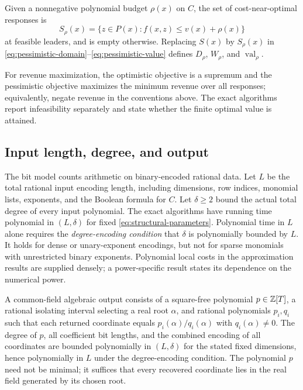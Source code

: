 Given a nonnegative polynomial budget $\rho(x)$ on $C$, the set of
cost-near-optimal responses is
\begin{equation}\label{eq:nearoptimal-set}
 S_\rho(x)=\{z\in P(x):f(x,z)\le v(x)+\rho(x)\}
\end{equation}
at feasible leaders, and is empty otherwise. Replacing $S(x)$ by
$S_\rho(x)$ in \eqref{eq:pessimistic-domain}--\eqref{eq:pessimistic-value}
defines $D_\rho$, $W_\rho$, and $\operatorname{val}_\rho$.

For revenue maximization, the optimistic objective is a supremum and the
pessimistic objective maximizes the minimum revenue over all responses;
equivalently, negate revenue in the conventions above. The exact
algorithms report infeasibility separately and state whether the finite
optimal value is attained.

\subsection{Input length, degree, and output}\label{subsec:encoding}

The bit model counts arithmetic on binary-encoded rational data. Let $L$
be the total rational input encoding length, including dimensions, row
indices, monomial lists, exponents, and the Boolean formula for $C$.
Let $\delta\ge2$ bound the actual total degree of every input polynomial.
The exact algorithms have running time polynomial in $(L,\delta)$ for
fixed \eqref{eq:structural-parameters}. Polynomial time in $L$ alone
requires the \emph{degree-encoding condition} that $\delta$ is polynomially
bounded by $L$. It holds for dense or unary-exponent encodings, but not for
sparse monomials with unrestricted binary exponents. Polynomial local costs
in the approximation results are supplied densely; a power-specific result
states its dependence on the numerical power.

A common-field algebraic output consists of a square-free polynomial
$p\in\mathbb Z[T]$, a rational isolating interval selecting a real root
$\alpha$, and rational polynomials $p_i,q_i$ such that each returned
coordinate equals $p_i(\alpha)/q_i(\alpha)$ with $q_i(\alpha)\ne0$.
The degree of $p$, all coefficient bit lengths, and the combined encoding
of all coordinates are bounded polynomially in $(L,\delta)$ for the stated
fixed dimensions, hence polynomially in $L$ under the degree-encoding
condition. The polynomial $p$ need not be minimal; it suffices that every
recovered coordinate lies in the real field generated by its chosen root.

